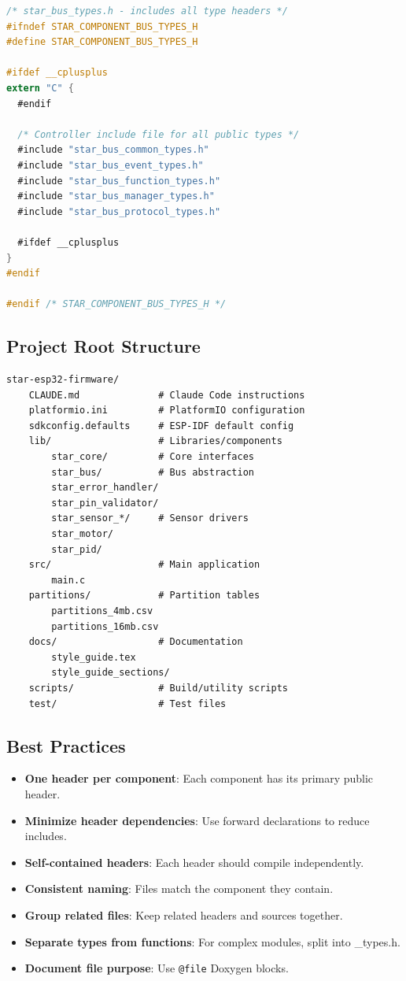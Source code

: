 \begin{lstlisting}[language=C]
/* star_bus_types.h - includes all type headers */
#ifndef STAR_COMPONENT_BUS_TYPES_H
#define STAR_COMPONENT_BUS_TYPES_H

#ifdef __cplusplus
extern "C" {
  #endif
  
  /* Controller include file for all public types */
  #include "star_bus_common_types.h"
  #include "star_bus_event_types.h"
  #include "star_bus_function_types.h"
  #include "star_bus_manager_types.h"
  #include "star_bus_protocol_types.h"
  
  #ifdef __cplusplus
}
#endif

#endif /* STAR_COMPONENT_BUS_TYPES_H */
\end{lstlisting}

\subsection{Project Root Structure}

\begin{verbatim}
star-esp32-firmware/
    CLAUDE.md              # Claude Code instructions
    platformio.ini         # PlatformIO configuration
    sdkconfig.defaults     # ESP-IDF default config
    lib/                   # Libraries/components
        star_core/         # Core interfaces
        star_bus/          # Bus abstraction
        star_error_handler/
        star_pin_validator/
        star_sensor_*/     # Sensor drivers
        star_motor/
        star_pid/
    src/                   # Main application
        main.c
    partitions/            # Partition tables
        partitions_4mb.csv
        partitions_16mb.csv
    docs/                  # Documentation
        style_guide.tex
        style_guide_sections/
    scripts/               # Build/utility scripts
    test/                  # Test files
\end{verbatim}

\subsection{Best Practices}

\begin{itemize}
    \item \textbf{One header per component}: Each component has its primary public header.
    \item \textbf{Minimize header dependencies}: Use forward declarations to reduce includes.
    \item \textbf{Self-contained headers}: Each header should compile independently.
    \item \textbf{Consistent naming}: Files match the component they contain.
    \item \textbf{Group related files}: Keep related headers and sources together.
    \item \textbf{Separate types from functions}: For complex modules, split into \_types.h.
    \item \textbf{Document file purpose}: Use \texttt{@file} Doxygen blocks.
\end{itemize}



